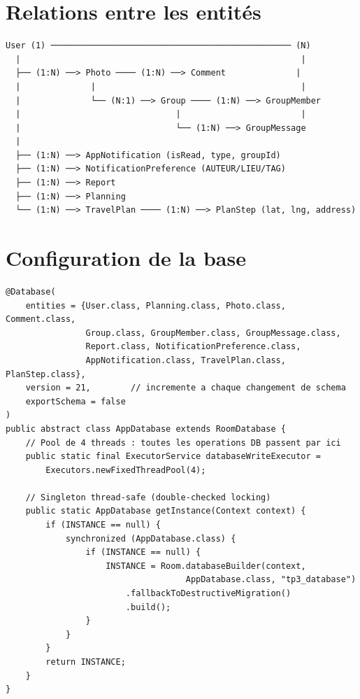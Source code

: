 \documentclass[a4paper,12pt,openany]{report}
\begin{document}
\section{Relations entre les entités}

\begin{tcolorbox}[mybox,colback=codebg,colframe=bord,
  left=8pt,right=8pt,top=8pt,bottom=8pt]
{\ttfamily\footnotesize\color{navy!80}
\begin{verbatim}
User (1) ──────────────────────────────────────────────── (N)
  |                                                        |
  ├── (1:N) ──> Photo ──── (1:N) ──> Comment              |
  |              |                                         |
  |              └── (N:1) ──> Group ──── (1:N) ──> GroupMember
  |                               |                        |
  |                               └── (1:N) ──> GroupMessage
  |
  ├── (1:N) ──> AppNotification (isRead, type, groupId)
  ├── (1:N) ──> NotificationPreference (AUTEUR/LIEU/TAG)
  ├── (1:N) ──> Report
  ├── (1:N) ──> Planning
  └── (1:N) ──> TravelPlan ──── (1:N) ──> PlanStep (lat, lng, address)
\end{verbatim}}
\end{tcolorbox}

\section{Configuration de la base}

\begin{lstlisting}
@Database(
    entities = {User.class, Planning.class, Photo.class, Comment.class,
                Group.class, GroupMember.class, GroupMessage.class,
                Report.class, NotificationPreference.class,
                AppNotification.class, TravelPlan.class, PlanStep.class},
    version = 21,        // incremente a chaque changement de schema
    exportSchema = false
)
public abstract class AppDatabase extends RoomDatabase {
    // Pool de 4 threads : toutes les operations DB passent par ici
    public static final ExecutorService databaseWriteExecutor =
        Executors.newFixedThreadPool(4);

    // Singleton thread-safe (double-checked locking)
    public static AppDatabase getInstance(Context context) {
        if (INSTANCE == null) {
            synchronized (AppDatabase.class) {
                if (INSTANCE == null) {
                    INSTANCE = Room.databaseBuilder(context,
                                    AppDatabase.class, "tp3_database")
                        .fallbackToDestructiveMigration()
                        .build();
                }
            }
        }
        return INSTANCE;
    }
}
\end{lstlisting}
\end{document}
